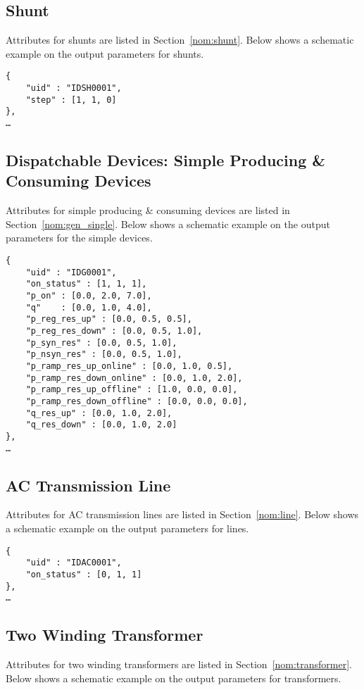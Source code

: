 \subsection{Shunt}
\label{sec:output_shunt}
Attributes for shunts are listed in Section~\ref{nom:shunt}.
Below shows a schematic example on the output parameters for shunts.
\begin{verbatim}
{
    "uid" : "IDSH0001",
    "step" : [1, 1, 0]
},
…    
\end{verbatim}

\subsection{Dispatchable Devices: Simple Producing \& Consuming Devices}
\label{sec:output_generators}
Attributes for simple producing \& consuming devices are listed in Section~\ref{nom:gen_single}.
Below shows a schematic example on the output parameters for the simple devices.

\begin{verbatim}
{
    "uid" : "IDG0001",
    "on_status" : [1, 1, 1],
    "p_on" : [0.0, 2.0, 7.0],
    "q"    : [0.0, 1.0, 4.0],
    "p_reg_res_up" : [0.0, 0.5, 0.5],
    "p_reg_res_down" : [0.0, 0.5, 1.0],
    "p_syn_res" : [0.0, 0.5, 1.0],
    "p_nsyn_res" : [0.0, 0.5, 1.0],
    "p_ramp_res_up_online" : [0.0, 1.0, 0.5],
    "p_ramp_res_down_online" : [0.0, 1.0, 2.0],
    "p_ramp_res_up_offline" : [1.0, 0.0, 0.0],
    "p_ramp_res_down_offline" : [0.0, 0.0, 0.0],
    "q_res_up" : [0.0, 1.0, 2.0],
    "q_res_down" : [0.0, 1.0, 2.0]
},
…     
\end{verbatim}

\subsection{AC Transmission Line}
\label{sec:output_acline}
Attributes for AC transmission lines are listed in Section~\ref{nom:line}.
Below shows a schematic example on the output parameters for lines.

\begin{verbatim}
{
    "uid" : "IDAC0001",
    "on_status" : [0, 1, 1]
},
…     
\end{verbatim}


\subsection{Two Winding Transformer}
\label{sec:output_2wtransformer}
Attributes for two winding transformers are listed in Section~\ref{nom:transformer}.
Below shows a schematic example on the output parameters for transformers.

